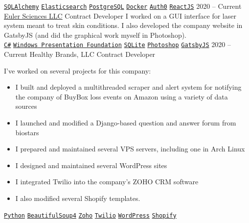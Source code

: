 \documentclass[9pt]{developercv} %
\begin{document}
\begin{entrylist}
{        \texttt{{\href{https://www.sqlalchemy.org/}{SQLAlchemy}}}\slashsep
        \texttt{{\href{https://www.elastic.co/}{Elasticsearch}}}\slashsep
        \texttt{{\href{https://www.postgresql.org/}{PostgreSQL}}}\slashsep
        \texttt{{\href{https://www.docker.com/}{Docker}}}\slashsep
        \texttt{{\href{https://auth0.com/}{Auth0}}}\slashsep
        \texttt{{\href{https://reactjs.org/}{ReactJS}}}
        }
    \entry
        {2020 -- Current}
        {\href{https://euler-sci.com}{Euler Sciences LLC}}
        {Contract Developer}
        {
            I worked on a GUI interface for laser system meant to treat skin
            conditions. I also developed the company website in GatsbyJS (and
            did the graphical work myself in Photoshop).
        \\
        \texttt{{\href{https://en.wikipedia.org/wiki/C_Sharp_(programming_language)}{C\#}}}\slashsep
        \texttt{{\href{https://en.wikipedia.org/wiki/Windows_Presentation_Foundation}{Windows Presentation Foundation}}}\slashsep
        \texttt{{\href{https://www.sqlite.org/index.html}{SQLite}}}\slashsep
        \texttt{{\href{https://www.adobe.com/products/photoshop.html}{Photoshop}}}\slashsep
        \texttt{{\href{https://www.gatsbyjs.org/}{GatsbyJS}}}
        }
    \entry
        {2020 -- Current}
        {Healthy Brands, LLC}
        {Contract Developer}
        {
            I've worked on several projects for this company:
            \begin{itemize}[leftmargin=*, noitemsep]
                \item I built and deployed a multithreaded scraper and alert system for notifying the company of BuyBox loss events on Amazon using a variety of data sources
                \item I launched and modified a Django-based question and answer forum from biostars
                \item I prepared and maintained several VPS servers, including one in Arch Linux
                \item I designed and maintained several WordPress sites
                \item I integrated Twilio into the company's ZOHO CRM software
                \item I also modified several Shopify templates.
            \end{itemize}
        \texttt{{\href{https://www.python.org/}{Python}}}\slashsep
        \texttt{{\href{https://www.crummy.com/software/BeautifulSoup/bs4/doc/}{BeautifulSoup4}}}\slashsep
        \texttt{{\href{https://www.zoho.com/}{Zoho}}}\slashsep
        \texttt{{\href{https://www.twilio.com/}{Twilio}}}\slashsep
        \texttt{{\href{https://wordpress.org/}{WordPress}}}\slashsep
        \texttt{{\href{https://www.shopify.com/}{Shopify}}}
        }
\end{entrylist}
\end{document}
